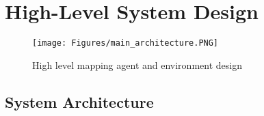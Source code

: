 






\chapter{High-Level System Design} 
\label{chapter:System_Design}



\begin{figure}[H]
    \centering
    \texttt{[image: Figures/main\_architecture.PNG]}
    \caption{High level mapping agent and environment design} 
    \label{fig:agent_and_environment_design}
\end{figure}



\section{System Architecture}

